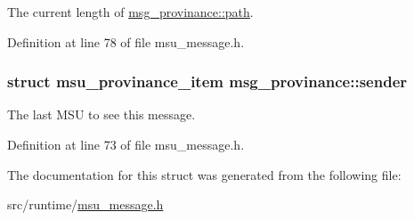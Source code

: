 The current length of \hyperlink{structmsg__provinance_a34afbc25ce0a338c85a16c9c2cc313db}{msg\-\_\-provinance\-::path}. 



Definition at line 78 of file msu\-\_\-message.\-h.

\hypertarget{structmsg__provinance_a139a4308b5386867c609ebe22c197b97}{
\subsubsection[{sender}]{\setlength{\rightskip}{0pt plus 5cm}struct {\bf msu\-\_\-provinance\-\_\-item} msg\-\_\-provinance\-::sender}}\label{structmsg__provinance_a139a4308b5386867c609ebe22c197b97}


The last M\-S\-U to see this message. 



Definition at line 73 of file msu\-\_\-message.\-h.



The documentation for this struct was generated from the following file\-:\begin{DoxyCompactItemize}
\item 
src/runtime/\hyperlink{msu__message_8h}{msu\-\_\-message.\-h}\end{DoxyCompactItemize}
